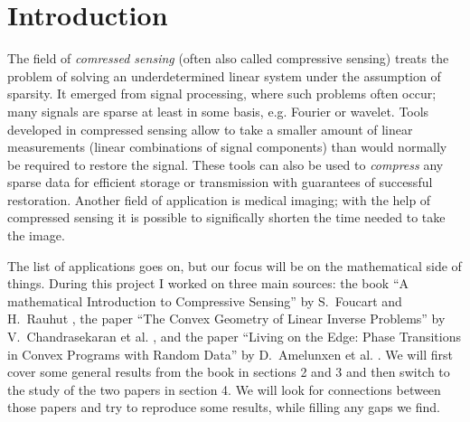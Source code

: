 \section{Introduction}

The field of \textit{comressed sensing} (often also called compressive sensing) treats the problem of solving an
underdetermined linear system under the assumption of sparsity.
It emerged from signal processing, where such problems often occur; many signals are sparse at least in some basis,
e.g. Fourier or wavelet.
Tools developed in compressed sensing allow to take a smaller amount of linear measurements
(linear combinations of signal components) than would normally be required to restore the signal.
These tools can also be used to \textit{compress} any sparse data for efficient storage or transmission with guarantees of
successful restoration.
Another field of application is medical imaging; with the help of compressed sensing it is possible to significally
shorten the time needed to take the image.

The list of applications goes on, but our focus will be on the mathematical side of things.
During this project I worked on three main sources: the book ``A mathematical Introduction to Compressive Sensing'' by
S.~Foucart and H.~Rauhut \cite{mathintro}, the paper ``The Convex Geometry of Linear Inverse Problems'' by V.~Chandrasekaran
et al. \cite{convexgeom}, and the paper ``Living on the Edge: Phase Transitions in Convex Programs with Random Data'' by
D.~Amelunxen et al. \cite{lote}.
We will first cover some general results from the book in sections 2 and 3 and then switch to the
study of the two papers in section 4.
We will look for connections between those papers and try to reproduce some results, while filling any gaps we find.